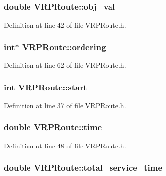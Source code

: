 \hypertarget{class_v_r_p_route_ac9e01d2cf8bc40618283eaf23c3089b3}{
\subsubsection[{obj\_\-val}]{\setlength{\rightskip}{0pt plus 5cm}double {\bf VRPRoute::obj\_\-val}}}
\label{class_v_r_p_route_ac9e01d2cf8bc40618283eaf23c3089b3}


Definition at line 42 of file VRPRoute.h.

\hypertarget{class_v_r_p_route_afc301079828a5849a0ce1e3e2bc9a9b2}{
\subsubsection[{ordering}]{\setlength{\rightskip}{0pt plus 5cm}int$\ast$ {\bf VRPRoute::ordering}}}
\label{class_v_r_p_route_afc301079828a5849a0ce1e3e2bc9a9b2}


Definition at line 62 of file VRPRoute.h.

\hypertarget{class_v_r_p_route_af7822965e17374753ff6da1e4d46257c}{
\subsubsection[{start}]{\setlength{\rightskip}{0pt plus 5cm}int {\bf VRPRoute::start}}}
\label{class_v_r_p_route_af7822965e17374753ff6da1e4d46257c}


Definition at line 37 of file VRPRoute.h.

\hypertarget{class_v_r_p_route_a6584731816b5b2b3782159485ce647db}{
\subsubsection[{time}]{\setlength{\rightskip}{0pt plus 5cm}double {\bf VRPRoute::time}}}
\label{class_v_r_p_route_a6584731816b5b2b3782159485ce647db}


Definition at line 48 of file VRPRoute.h.

\hypertarget{class_v_r_p_route_a2e3a23496201d0974c96e187363c2110}{
\subsubsection[{total\_\-service\_\-time}]{\setlength{\rightskip}{0pt plus 5cm}double {\bf VRPRoute::total\_\-service\_\-time}}}
\label{class_v_r_p_route_a2e3a23496201d0974c96e187363c2110}


